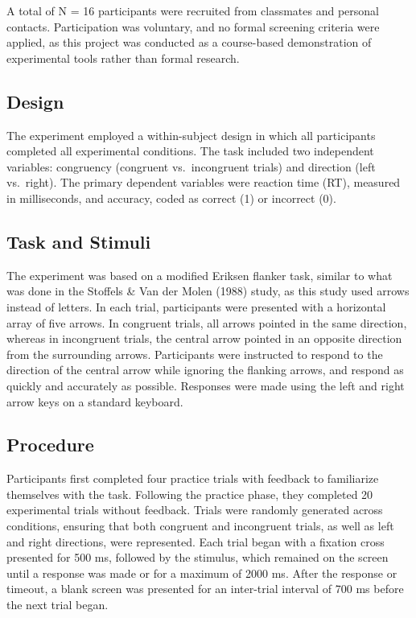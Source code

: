 \documentclass[
  authoryear,
  preprint]{elsarticle}
\begin{document}
A total of N = 16 participants were recruited from classmates and
personal contacts. Participation was voluntary, and no formal screening
criteria were applied, as this project was conducted as a course-based
demonstration of experimental tools rather than formal research.

\subsection{Design}\label{design}

The experiment employed a within-subject design in which all
participants completed all experimental conditions. The task included
two independent variables: congruency (congruent vs.~incongruent trials)
and direction (left vs.~right). The primary dependent variables were
reaction time (RT), measured in milliseconds, and accuracy, coded as
correct (1) or incorrect (0).

\subsection{Task and Stimuli}\label{task-and-stimuli}

The experiment was based on a modified Eriksen flanker task, similar to
what was done in the Stoffels \& Van der Molen (1988) study, as this
study used arrows instead of letters. In each trial, participants were
presented with a horizontal array of five arrows. In congruent trials,
all arrows pointed in the same direction, whereas in incongruent trials,
the central arrow pointed in an opposite direction from the surrounding
arrows. Participants were instructed to respond to the direction of the
central arrow while ignoring the flanking arrows, and respond as quickly
and accurately as possible. Responses were made using the left and right
arrow keys on a standard keyboard.

\subsection{Procedure}\label{procedure}

Participants first completed four practice trials with feedback to
familiarize themselves with the task. Following the practice phase, they
completed 20 experimental trials without feedback. Trials were randomly
generated across conditions, ensuring that both congruent and
incongruent trials, as well as left and right directions, were
represented. Each trial began with a fixation cross presented for 500
ms, followed by the stimulus, which remained on the screen until a
response was made or for a maximum of 2000 ms. After the response or
timeout, a blank screen was presented for an inter-trial interval of 700
ms before the next trial began.
\end{document}
